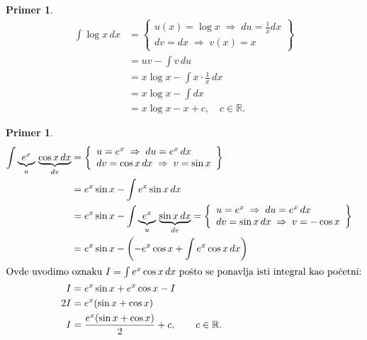 \documentclass[11pt]{article}
\newcounter{mathitem}
\theoremstyle{plain}
\newtheorem{primer}[mathitem]{Primer}
\theoremstyle{serbnodot}
\begin{document}
\begin{primer}
  \begin{align*}
    \int \log x \, dx 
    &= 
    \left\{
    \begin{array}{l}
    u(x) = \log x \;\Rightarrow\; du = \frac{1}{x} dx \\
    dv = dx \;\Rightarrow\; v(x) = x
    \end{array}
    \right\} \\
    &= u v - \int v \, du \\
    &= x \log x - \int x \cdot \frac{1}{x} \, dx \\
    &= x \log x - \int dx \\
    &= x \log x - x + c, \quad c \in \mathbb{R}.
\end{align*}

\end{primer}


\begin{primer}
  \begin{align*}
    \int \underbrace{e^x}_{u} \, \underbrace{\cos x \, dx}_{dv}
    &= 
    \left\{
      \begin{array}{l}
          u = e^x \;\Rightarrow\; du = e^x \, dx \\
          dv = \cos x \, dx \;\Rightarrow\; v = \sin x
      \end{array}
    \right\} \\
    &= e^x \sin x - \int e^x \sin x \, dx \\
    &= e^x \sin x - 
    \int \underbrace{e^x}_{u} \, \underbrace{\sin x \, dx}_{dv}
    =
    \left\{
      \begin{array}{l}
          u = e^x \;\Rightarrow\; du = e^x \, dx \\
          dv = \sin x \, dx \;\Rightarrow\; v = -\cos x
      \end{array}
    \right\} \\
    &= e^x \sin x - \left(-e^x \cos x + \int e^x \cos x \, dx \right) \\
    \intertext{Ovde uvodimo oznaku $ I = \int e^x \cos x \, dx $ pošto se ponavlja isti integral kao početni:}
    I &= e^x \sin x + e^x \cos x - I \\
    2I &= e^x (\sin x + \cos x) \\
    I &= \frac{e^x (\sin x + \cos x)}{2} + c,\qquad c \in \mathbb{R}.
\end{align*}



\end{primer}
\end{document}
